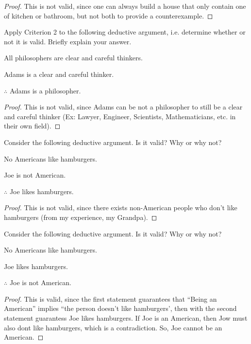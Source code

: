 \documentclass{article}
\begin{document}
\begin{proof}
    This is not valid, since one can always build a house that only contain one of kitchen or bathroom, but not both to provide a counterexample.
\end{proof}

\newpage

\begin{ques}\label{q4}
Apply Criterion 2 to the following deductive argument, i.e. determine whether or not it is valid. Briefly explain your answer.

All philosophers are clear and careful thinkers.

Adams is a clear and careful thinker.

$\therefore$ Adams is a philosopher.
\end{ques}

\begin{proof}
    This is not valid, since Adams can be not a philosopher to still be a clear and careful thinker (Ex: Lawyer, Engineer, Scientists, Mathematicians, etc. in their own field).
\end{proof}

\hfil

\begin{ques}\label{q5}
Consider the following deductive argument. Is it valid? Why or
why not?

No Americans like hamburgers.

Joe is not American.

$\therefore$ Joe likes hamburgers.
\end{ques}

\begin{proof}
    This is not valid, since there exists non-American people who don't like hamburgers (from my experience, my Grandpa).
\end{proof}

\hfil

\begin{ques}\label{q6}
Consider the following deductive argument. Is it valid? Why or
why not?

No Americans like hamburgers.

Joe likes hamburgers.

$\therefore$ Joe is not American.
\end{ques}

\begin{proof}
    This is valid, since the first statement guarantees that ``Being an American'' implies ``the person doesn't like hamburgers', then with the second statement guarantess Joe likes hamburgers. If Joe is an American, then Jow must also dont like hamburgers, which is a contradiction. So, Joe cannot be an American.
\end{proof}
\end{document}
